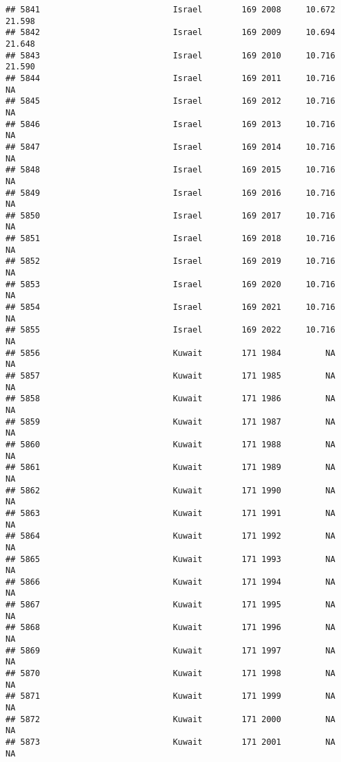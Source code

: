 \documentclass[
]{article}
\begin{document}
\begin{verbatim}
## 5841                           Israel        169 2008     10.672     21.598
## 5842                           Israel        169 2009     10.694     21.648
## 5843                           Israel        169 2010     10.716     21.590
## 5844                           Israel        169 2011     10.716         NA
## 5845                           Israel        169 2012     10.716         NA
## 5846                           Israel        169 2013     10.716         NA
## 5847                           Israel        169 2014     10.716         NA
## 5848                           Israel        169 2015     10.716         NA
## 5849                           Israel        169 2016     10.716         NA
## 5850                           Israel        169 2017     10.716         NA
## 5851                           Israel        169 2018     10.716         NA
## 5852                           Israel        169 2019     10.716         NA
## 5853                           Israel        169 2020     10.716         NA
## 5854                           Israel        169 2021     10.716         NA
## 5855                           Israel        169 2022     10.716         NA
## 5856                           Kuwait        171 1984         NA         NA
## 5857                           Kuwait        171 1985         NA         NA
## 5858                           Kuwait        171 1986         NA         NA
## 5859                           Kuwait        171 1987         NA         NA
## 5860                           Kuwait        171 1988         NA         NA
## 5861                           Kuwait        171 1989         NA         NA
## 5862                           Kuwait        171 1990         NA         NA
## 5863                           Kuwait        171 1991         NA         NA
## 5864                           Kuwait        171 1992         NA         NA
## 5865                           Kuwait        171 1993         NA         NA
## 5866                           Kuwait        171 1994         NA         NA
## 5867                           Kuwait        171 1995         NA         NA
## 5868                           Kuwait        171 1996         NA         NA
## 5869                           Kuwait        171 1997         NA         NA
## 5870                           Kuwait        171 1998         NA         NA
## 5871                           Kuwait        171 1999         NA         NA
## 5872                           Kuwait        171 2000         NA         NA
## 5873                           Kuwait        171 2001         NA         NA

\end{verbatim}
\end{document}
